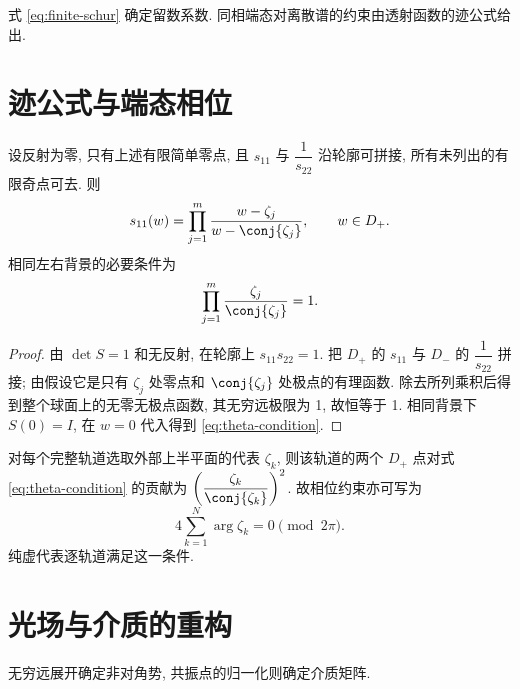 式 \eqref{eq:finite-schur} 确定留数系数. 同相端态对离散谱的约束由透射函数的迹公式给出.

\section{迹公式与端态相位}
\begin{proposition}[无反射迹公式与相位约束]\label{prop:theta}
设反射为零, 只有上述有限简单零点, 且 $s_{11}$ 与 $\dfrac{1}{s_{22}}$ 沿轮廓可拼接, 所有未列出的有限奇点可去. 则
\begin{equation}\label{eq:trace}
s_{11}(w)=\prod_{j=1}^{m}\dfrac{w-\zeta_j}{w-\conj{\zeta_j}},
\qquad w\in D_+.
\end{equation}
相同左右背景的必要条件为
\begin{equation}\label{eq:theta-condition}
\prod_{j=1}^{m}\dfrac{\zeta_j}{\conj{\zeta_j}}=1.
\end{equation}
\end{proposition}
\begin{proof}
由 $\det S=1$ 和无反射, 在轮廓上 $s_{11}s_{22}=1$. 把 $D_+$ 的 $s_{11}$ 与 $D_-$ 的 $\dfrac{1}{s_{22}}$ 拼接; 由假设它是只有 $\zeta_j$ 处零点和 $\conj{\zeta_j}$ 处极点的有理函数. 除去所列乘积后得到整个球面上的无零无极点函数, 其无穷远极限为 1, 故恒等于 1. 相同背景下 $S(0)=I$, 在 $w=0$ 代入得到 \eqref{eq:theta-condition}.
\end{proof}
对每个完整轨道选取外部上半平面的代表 $\zeta_k$, 则该轨道的两个 $D_+$ 点对式 \eqref{eq:theta-condition} 的贡献为 $\left(\dfrac{\zeta_k}{\conj{\zeta_k}}\right)^2$. 故相位约束亦可写为
\[
4\sum\limits_{k=1}^N\arg\zeta_k=0\pmod{2\pi}.
\]
纯虚代表逐轨道满足这一条件.

\section{光场与介质的重构}
无穷远展开确定非对角势, 共振点的归一化则确定介质矩阵.


